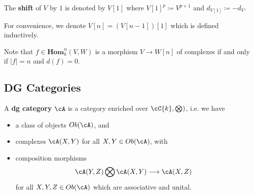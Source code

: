 \begin{defn}
The {\bf shift} of $ V $ by $ 1 $ is denoted by $ V[1] $ where $ V[1]^{p} \coloneqq V^{p+1} $ and $ d_{V[1]}\coloneqq -d_{V} $.
\end{defn}

For convenience, we denote $ V[n] = (V[n-1])[1] $ which is defined inductively. 

Note that $ f\in\mathbf{Hom}^{n}_{k}(V,W) $ is a morphism $ V \to W[n] $ of complexes if and only if $ |f| = n $ and $ d(f) = 0 $. 


\subsection{DG Categories}

\begin{defn}[Kelly, 1965]
A {\bf dg category} $ \cA $ is a category enriched over $ \cC{k}, \bigotimes) $, i.e. we have 
\begin{itemize}
    \item a class of objects $ Ob(\cA) $, and
    \item complexes $ \cA(X,Y) $ for all $ X,Y \in Ob(\cA) $, with
    \item composition morphisms
    \[ \cA(Y,Z) \bigotimes\cA(X,Y) \longrightarrow \cA(X,Z) \]
    for all $ X,Y,Z \in Ob(\cA) $ which are associative and unital.
\end{itemize}
\end{defn}

